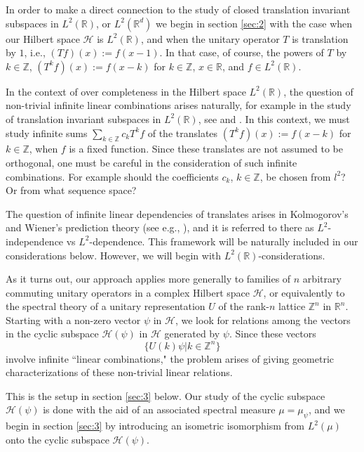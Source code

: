 \documentclass{birkmult}
\theoremstyle{definition}
\theoremstyle{remark}
\numberwithin{equation}{section}
\begin{document}
     In order to make a direct connection to the study of closed translation 
invariant subspaces in $L^{2}(\mathbb{R})$, or $L^{2}(\mathbb{R}^{d})$ we 
begin in section \ref{sec:2} with the case when our Hilbert space 
$\mathcal{H}$ is $L^{2}(\mathbb{R})$, and when the unitary operator $T$ 
is translation by $1$, i.e., $(Tf)(x) := f(x - 1)$.
In that case, of course, the powers of $T$ by $k \in \mathbb{Z}$, 
$(T^{k} f)(x) := f(x - k)$  for $k \in \mathbb{Z}$, $x \in \mathbb{R}$, and 
$f \in L^{2}(\mathbb{R})$.

       In the context of over completeness in the Hilbert space 
$L^{2}(\mathbb{R})$, the question of non-trivial infinite linear 
combinations arises naturally, for example in the study of translation 
invariant subspaces in $L^{2}(\mathbb{R})$, see \cite{Dau92} and \cite{Hel64}. 
In this context, we must study infinite sums 
$\sum_{k \in \mathbb{Z}} c_{k}T^{k}f$ of the translates 
$(T^{k} f)(x) := f(x - k)$ for $k \in \mathbb{Z}$, when $f$ is a fixed 
function. Since these translates are not assumed to be orthogonal, one must 
be careful in the consideration of such infinite combinations. For example 
should the coefficients $c_{k}$, $k \in \mathbb{Z}$, be chosen from $l^{2}$? 
Or from what sequence space? 

      The question of infinite linear dependencies of translates arises in 
Kolmogorov's and Wiener's prediction theory (see e.g., \cite{MiSa80}), and 
it is referred to there as $L^{2}$-independence vs $L^{2}$-dependence. This 
framework will be naturally included in our considerations below. However, 
we will begin with $L^{2}(\mathbb{R})$-considerations. 

      As it turns out, our approach applies more generally to families 
of $n$ arbitrary commuting unitary operators in a complex Hilbert space 
$\mathcal{H}$, or equivalently to the spectral theory of a unitary 
representation $U$ of the rank-$n$ lattice $\mathbb{Z}^{n}$ in 
$\mathbb{R}^{n}$. Starting with a non-zero vector $\psi$ in $\mathcal{H}$, 
we look for relations among the vectors in the cyclic subspace 
$\mathcal{H}(\psi)$ in $\mathcal{H}$ generated by $\psi$. Since these 
vectors 
\[
  \{U(k)\psi | k \in \mathbb{Z}^{n}\}
\]
involve infinite ``linear combinations," the problem arises of giving 
geometric characterizations of these non-trivial linear relations.
 
      This is the setup in section \ref{sec:3} below. Our study of the 
cyclic subspace $\mathcal{H}(\psi)$ is done with the aid of an 
associated spectral measure $\mu = \mu_{\psi}$, and we begin in 
section \ref{sec:3} by introducing an isometric isomorphism from 
$L^{2}(\mu)$ onto the cyclic subspace $\mathcal{H}(\psi)$.
 
\end{document}
